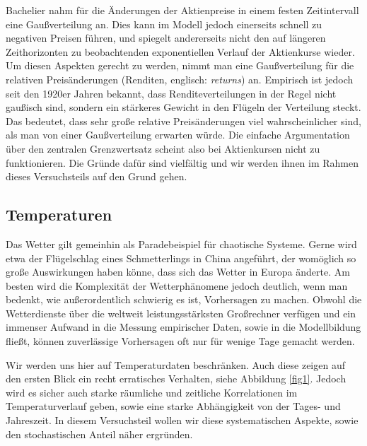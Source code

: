 \documentclass[a4paper,10pt]{article}
\begin{document}
Bachelier nahm für die Änderungen der Aktienpreise in einem festen Zeitintervall eine Gaußverteilung an. 
Dies kann im Modell jedoch einerseits schnell zu negativen Preisen führen, und spiegelt  andererseits nicht den auf längeren Zeithorizonten zu beobachtenden exponentiellen Verlauf der Aktienkurse wieder. 
Um diesen Aspekten gerecht zu werden, nimmt man eine Gaußverteilung für die relativen Preisänderungen (Renditen, englisch: \textit{returns}) an. 
Empirisch ist jedoch seit den 1920er Jahren bekannt, dass Renditeverteilungen in der Regel nicht gaußisch sind, sondern ein stärkeres Gewicht in den Flügeln der Verteilung steckt. Das bedeutet, dass sehr große relative Preisänderungen viel wahrscheinlicher sind, als man von einer Gaußverteilung erwarten würde.
Die einfache Argumentation über den zentralen Grenzwertsatz scheint also bei Aktienkursen nicht zu funktionieren. Die Gründe dafür sind vielfältig und wir werden ihnen im Rahmen dieses Versuchsteils auf den Grund gehen.




\subsection{Temperaturen}
Das Wetter gilt gemeinhin als Paradebeispiel für chaotische Systeme. 
Gerne wird etwa der Flügel\-schlag eines Schmetterlings in China angeführt, der womöglich so große Auswirkungen haben könne, dass sich das Wetter in Europa änderte. 
Am besten wird die Komplexität der Wetterphänomene jedoch deutlich, wenn man bedenkt, wie außerordentlich schwierig es ist, Vorhersagen zu machen. 
Obwohl die Wetterdienste über die weltweit leistungsstärksten Großrechner verfügen und ein immenser Aufwand in die Messung empirischer Daten, sowie in die Modellbildung fließt, können zuverlässige Vorhersagen oft nur für wenige Tage gemacht werden.

Wir werden uns hier auf Temperaturdaten beschränken. Auch diese zeigen auf den ersten Blick ein recht erratisches Verhalten, siehe Abbildung \ref{fig1}. Jedoch wird es sicher auch starke räumliche und zeitliche Korrelationen im Temperaturverlauf geben, sowie eine starke Abhängigkeit von der Tages- und Jahreszeit.
In diesem Versuchsteil wollen wir diese systematischen Aspekte, sowie den stochastischen Anteil näher ergründen.
\end{document}
